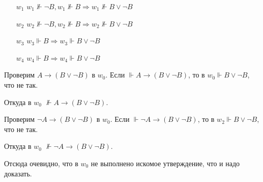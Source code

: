 \begin{enumerate}
\begin{enumerate}
        \item[$w_1$] $w_1 \not\Vdash \neg B,w_1 \not \Vdash B \Rightarrow w_1 \not \Vdash B \lor \neg B $
        
        \item[$w_2$] $w_2 \not\Vdash \neg B,w_2 \not \Vdash B \Rightarrow w_2 \not \Vdash B \lor \neg B $
        
        
        \item[$w_3$] $w_3  \Vdash B \Rightarrow w_3  \Vdash B \lor \neg B $
        
        
        \item[$w_4$] $w_4  \Vdash B \Rightarrow w_4  \Vdash B \lor \neg B $
    \end{enumerate}

    Проверим $A \rightarrow (B \lor \neg B)$ в $w_0$. Если $\Vdash A \rightarrow (B \lor \neg B)$, то в $w_0 \Vdash B \lor \neg B$, что не так. 

    Откуда в $w_0$ $\not \Vdash A \rightarrow (B \lor \neg B)$.

    Проверим $\neg A \rightarrow (B \lor \neg B)$ в $w_0$. Если $\Vdash \neg A \rightarrow (B \lor \neg B)$, то в $w_2 \Vdash B \lor \neg B$, что не так.

    Откуда в $w_0$ $\not \Vdash \neg A \rightarrow (B \lor \neg B)$.

    Отсюда очевидно, что в $w_0$ не выполнено искомое утверждение, что и надо доказать.

    
    
\end{enumerate}